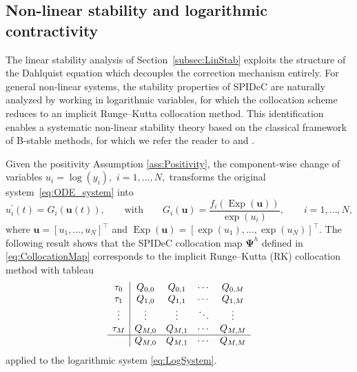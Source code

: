 \documentclass[a4paper,num-refs]{oup-contemporary-spidec}
\begin{document}
\subsection{Non-linear stability and logarithmic contractivity}
\label{subsec:NonlinStab}

The linear stability analysis of Section~\ref{subsec:LinStab} exploits the structure of the Dahlquist equation which decouples the correction mechanism entirely. For general non-linear systems, the stability properties of SPIDeC are naturally analyzed by working in logarithmic variables, for which the collocation scheme reduces to an implicit Runge--Kutta collocation method. This identification enables a systematic non-linear stability theory based on the classical framework of B-stable methods, for which we refer the reader to \cite[Chapter IV.12]{Hairer_1996} and \cite[Chapter 3, Section 35]{Butcher}. %

Given the positivity Assumption \eqref{ass:Positivity}, the component-wise change of variables $u_i = \log(y_i),$ $i=1,\dots,N,$ transforms the original system~\eqref{eq:ODE_system} into
\begin{equation}\label{eq:LogSystem}
    u^{\prime}_i(t) = G_i(\bm{u}(t)),
    \qquad \text{with} \qquad
    G_i(\bm{u}) = \dfrac{f_i(\operatorname{Exp}(\bm{u}))}{\exp(u_i)},
    \qquad i=1,\dots,N,
\end{equation}
where $\bm{u}=[u_1,\dots,u_N]^\top$ and $\operatorname{Exp}(\bm{u}) = [\exp(u_1),\dots,\exp(u_N)]^\top$. The following result shows that the SPIDeC collocation map $\bm{\Psi}^h$ defined in \eqref{eq:CollocationMap} corresponds to the implicit Runge--Kutta (RK) collocation method with tableau
\begin{equation}\label{eq:Tableau}
    \begin{array}{c|cccc}
    \tau_0 & Q_{0,0} & Q_{0,1} & \cdots & Q_{0,M} \\
    \tau_1 & Q_{1,0} & Q_{1,1} & \cdots & Q_{1,M} \\
    \vdots & \vdots  & \vdots  & \ddots & \vdots  \\
    \tau_M & Q_{M,0} & Q_{M,1} & \cdots & Q_{M,M} \\
    \hline
           & Q_{M,0} & Q_{M,1} & \cdots & Q_{M,M}
    \end{array}
\end{equation}
applied to the logarithmic system \eqref{eq:LogSystem}.
\end{document}

